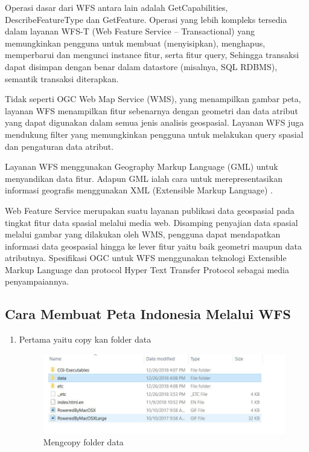 Operasi dasar dari WFS antara lain adalah GetCapabilities, DescribeFeatureType dan GetFeature. Operasi yang lebih kompleks tersedia dalam layanan WFS-T (Web Feature Service – Transactional) yang memungkinkan pengguna untuk membuat (menyisipkan), menghapus, memperbarui dan mengunci instance fitur, serta fitur query, Sehingga transaksi dapat disimpan dengan benar dalam datastore (misalnya, SQL RDBMS), semantik transaksi diterapkan.

Tidak seperti OGC Web Map Service (WMS), yang menampilkan gambar peta, layanan WFS menampilkan fitur sebenarnya dengan geometri dan data atribut yang dapat digunakan dalam semua jenis analisis geospasial. Layanan WFS juga mendukung filter yang memungkinkan pengguna untuk melakukan query spasial dan pengaturan data atribut.

Layanan WFS menggunakan Geography Markup Language (GML) untuk menyandikan data fitur. Adapun GML ialah cara untuk merepresentasikan informasi geografis menggunakan XML (Extensible Markup Language) \cite{adityapeluang}.

Web Feature Service merupakan suatu layanan publikasi data geospasial pada tingkat fitur data spasial melalui media web. Disamping penyajian data spasial melalui gambar yang dilakukan oleh WMS, pengguna dapat mendapatkan informasi data geospasial hingga ke lever fitur yaitu baik geometri maupun data atributnya. Spesifikasi OGC untuk WFS menggunakan teknologi Extensible Markup Language dan protocol Hyper Text Transfer Protocol sebagai media penyampaiannya.

\subsection{Cara Membuat Peta Indonesia Melalui WFS}
\begin{enumerate}
\item Pertama yaitu copy kan folder data
\begin{figure}[htbp]
\centering
\includegraphics[width=1\textwidth]{pictures/Mengcopy_folder_data}
\caption{Mengcopy folder data}
\label{labelgambar2}
\end{figure}
\end{enumerate}
